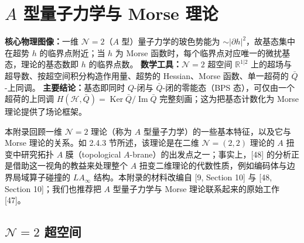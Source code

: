 
\section{$A$ 型量子力学与 Morse 理论}

\begin{keytakeaway}
\textbf{核心物理图像：}一维 $\mathcal{N}=2$（$A$ 型）量子力学的玻色势能为 $\sim|\partial h|^2$，故基态集中在超势 $h$ 的临界点附近；当 $h$ 为 Morse 函数时，每个临界点对应唯一的微扰基态，理论的基态数即 $h$ 的临界点数。
\textbf{数学工具：}$\mathcal{N}=2$ 超空间 $\mathbb{R}^{1|2}$ 上的超场与超导数、按超空间积分构造作用量、超势的 Hessian、Morse 函数、单一超荷的 $\bar Q$-上同调。
\textbf{主要结论：}基态即同时 $Q$-闭与 $\bar Q$-闭的零能态（BPS 态），可仅由一个超荷的上同调 $H(\mathcal{H},\bar Q)=\operatorname{Ker}\bar Q/\operatorname{Im}\bar Q$ 完整刻画；这为把基态计数化为 Morse 理论提供了场论框架。
\end{keytakeaway}

本附录回顾一维 $\mathcal{N}=2$ 理论（称为 $A$ 型量子力学）的一些基本特征，以及它与 Morse 理论的关系。如 2.4.3 节所述，该理论是在二维 $\mathcal{N}=(2,2)$ 理论的 $A$ 扭变中研究拓扑 $A$ 膜（topological $A$-brane）的出发点之一；事实上，[48] 的分析正是借助这一视角的教益来处理整个 $A$ 扭变二维理论的代数性质，例如编码体与边界局域算子碰撞的 $L A_\infty$ 结构。本附录的材料改编自 [9, Section 10] 与 [48, Section 10]；我们也推荐把 $A$ 型量子力学与 Morse 理论联系起来的原始工作 [47]。

\subsection{$\mathcal{N}=2$ 超空间}

